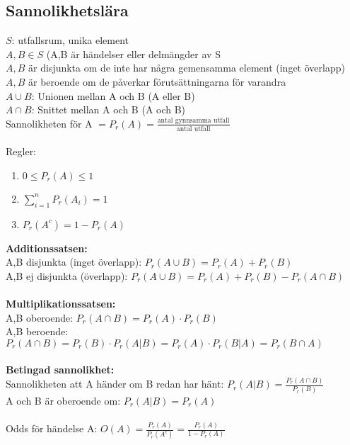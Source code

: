 \documentclass[a4paper,10pt]{article}
\begin{document}
\newpage

\subsection*{Sannolikhetslära}
$S$: utfallsrum, unika element \\
$A,B \in S$ (A,B är händelser eller delmängder av S \\
$A,B$ är disjunkta om de inte har några gemensamma element (inget överlapp) \\
$A,B$ är beroende om de påverkar förutsättningarna för varandra \\
$A \cup B$: Unionen mellan A och B (A eller B) \\
$A \cap B$: Snittet mellan A och B (A och B) \\
Sannolikheten för A $= P_r(A) = \frac{\text{antal gynnsamma utfall}}{\text{antal utfall}}$ \\
 \\
Regler:
\begin{enumerate}
  \item{$0 \leq P_r(A) \leq 1$}
  \item{$\sum_{i=1}^n P_r(A_i) = 1$}
  \item{$P_r(A^c) = 1 - P_r(A)$}
\end{enumerate}
{\bf Additionssatsen:} \\
A,B disjunkta (inget överlapp): $P_r(A \cup B) = P_r(A) + P_r(B)$ \\
A,B ej disjunkta (överlapp): $P_r(A \cup B) = P_r(A) + P_r(B) - P_r(A \cap B)$ \\
 \vspace{1mm} \\
{\bf Multiplikationssatsen:} \\
A,B oberoende: $P_r(A \cap B) = P_r(A) \cdot P_r(B)$ \\
A,B beroende: $P_r(A \cap B) = P_r(B) \cdot P_r(A|B) = P_r(A) \cdot P_r(B|A) = P_r(B \cap A)$ \\
 \vspace{1mm} \\
{\bf Betingad sannolikhet:} \\
Sannolikheten att A händer om B redan har hänt: $P_r(A|B) = \frac{P_r(A \cap B)}{P_r(B)}$ \\
A och B är oberoende om: $P_r(A|B) = P_r(A)$ \\
\vspace{1mm} \\
Odds för händelse A: $O(A) = \frac{P_r(A)}{P_r(A^c)} = \frac{P_r(A)}{1-P_r(A)}$
\end{document}
